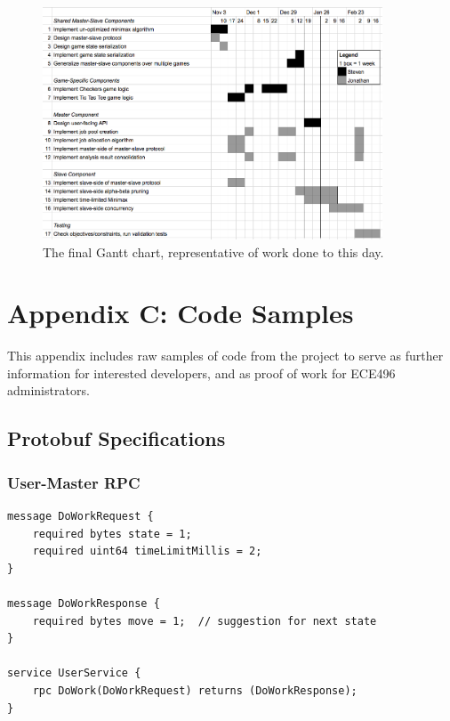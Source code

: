 \documentclass[pdftex,12pt,a4paper]{article}
\begin{document}
\begin{figure}[H]
\begin{center}
\includegraphics[width=0.9\textwidth]{img/gantt-final}
\caption{The final Gantt chart, representative of work done to this day.}
\end{center}
\end{figure}

%
%
\pagebreak





%
%
\pagebreak
\section{Appendix C: Code Samples}

This appendix includes raw samples of code from the project to serve as further information for interested developers, and as proof of work for ECE496 administrators.

\subsection{Protobuf Specifications}\label{sec:protobuf-sample}

\subsubsection*{User-Master RPC}
\begin{lstlisting}
message DoWorkRequest {
    required bytes state = 1;
    required uint64 timeLimitMillis = 2;
}

message DoWorkResponse {
    required bytes move = 1;  // suggestion for next state
}

service UserService {
    rpc DoWork(DoWorkRequest) returns (DoWorkResponse);
}
\end{lstlisting}
\end{document}
